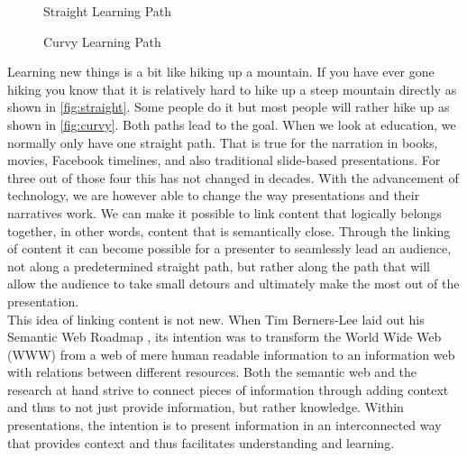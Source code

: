 \documentclass[twoside, 12pt]{article}
\begin{document}
\begin{figure}
\vspace{-28pt}
  \begin{center}
\vspace{-20pt}
  \caption{Straight Learning Path}
  \label{fig:straight}
\vspace{5pt}  

  \end{center}
\vspace{-20pt}
  \caption{Curvy Learning Path}
  \label{fig:curvy}
\vspace{-10pt}
\end{figure}

Learning new things is a bit like hiking up a mountain. If you have ever gone hiking you know that it is relatively hard to hike up a steep mountain directly as shown in \autoref{fig:straight}. Some people do it but most people will rather hike up as shown in \autoref{fig:curvy}. Both paths lead to the goal. When we look at education, we normally only have one straight path. That is true for the narration in books, movies, Facebook timelines, and also traditional slide-based presentations. For three out of those four this has not changed in decades. With the advancement of technology, we are however able to change the way presentations and their narratives work. We can make it possible to link content that logically belongs together, in other words, content that is semantically close. Through the linking of content it can become possible for a presenter to seamlessly lead an audience, not along a predetermined straight path, but rather along the path that will allow the audience to take small detours and ultimately make the most out of the presentation.\\

This idea of linking content is not new. When Tim Berners-Lee laid out his Semantic Web Roadmap \cite{BernersLee:tsw98}, its intention was to transform the World Wide Web (WWW) from a web of mere human readable information to an information web with relations between different resources. Both the semantic web and the research at hand strive to connect pieces of information through adding context and thus to not just provide information, but rather knowledge. Within presentations, the intention is to present information in an interconnected way that provides context and thus facilitates understanding and learning.\\
\end{document}
